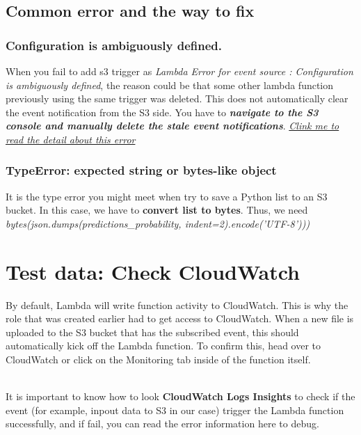 \documentclass[12pt]{article}
\begin{document}
\subsection{Common error and the way to fix}
\subsubsection{Configuration is ambiguously defined.}
When you fail to add s3 trigger as \textit{Lambda Error for event source : Configuration is ambiguously defined}, the reason could be that some other lambda function previously using the same trigger was deleted. This does not automatically clear the event notification from the S3 side. You have to \textbf{\textit{navigate to the S3 console and manually delete the stale event notifications}}.
\href{https://forums.aws.amazon.com/thread.jspa?messageID=670712}{\textit{Clink me to read the detail about this error}}


\subsubsection{TypeError: expected string or bytes-like object}
It is the type error you might meet when try to save a Python list to an S3 bucket. In this case, we have to \textbf{convert  list to bytes}. Thus, we need \textit{bytes(json.dumps(predictions_probability, indent=2).encode('UTF-8')))}




\newpage
\section{Test data: Check CloudWatch}

By default, Lambda will write function activity to CloudWatch. This is why the role that was created earlier had to get access to CloudWatch. When a new file is uploaded to the S3 bucket that has the subscribed event, this should automatically kick off the Lambda function. To confirm this, head over to CloudWatch or click on the Monitoring tab inside of the function itself. 

\\
\noindent
It is important to know how to look \textbf{CloudWatch Logs Insights} to check if the event (for example, inpout data to S3 in our case) trigger the Lambda function successfully, and if fail, you can read the error information here to debug.
\end{document}
